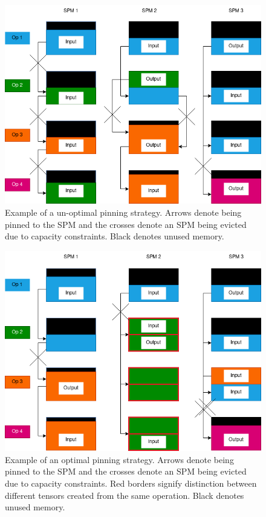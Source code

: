 \begin{figure}[th]
\centering
\includegraphics[scale=0.7]{Figures/reuse_example_pin_map_fail_1.png}
\decoRule
\caption[Naive Pinning Example]{Example of a un-optimal pinning strategy. Arrows
denote being pinned to the SPM and the crosses denote
an SPM being evicted due to capacity constraints.
Black denotes unused memory.}
\label{fig:pin_naive}
\end{figure}


\begin{figure}[th]
\centering
\includegraphics[scale=0.7]{Figures/reuse_example_pin_all.png}
\decoRule
\caption[Optimal Pinning Example]{Example of an optimal pinning strategy. Arrows
denote being pinned to the SPM and the crosses denote
an SPM being evicted due to capacity constraints. Red borders signify
distinction between different tensors created from the same operation.
Black denotes unused memory.}
\label{fig:pin_optimal}
\end{figure}

